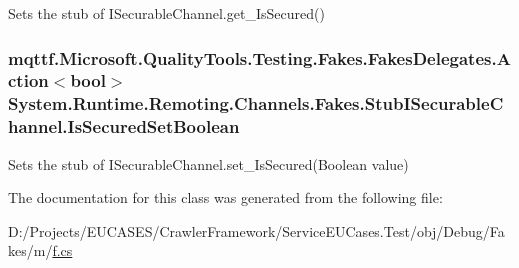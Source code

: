 Sets the stub of I\-Securable\-Channel.\-get\-\_\-\-Is\-Secured()

\hypertarget{class_system_1_1_runtime_1_1_remoting_1_1_channels_1_1_fakes_1_1_stub_i_securable_channel_a72bf924abde0e542f6be5ee725c185f9}{
\subsubsection[{Is\-Secured\-Set\-Boolean}]{\setlength{\rightskip}{0pt plus 5cm}mqttf.\-Microsoft.\-Quality\-Tools.\-Testing.\-Fakes.\-Fakes\-Delegates.\-Action$<$bool$>$ System.\-Runtime.\-Remoting.\-Channels.\-Fakes.\-Stub\-I\-Securable\-Channel.\-Is\-Secured\-Set\-Boolean}}\label{class_system_1_1_runtime_1_1_remoting_1_1_channels_1_1_fakes_1_1_stub_i_securable_channel_a72bf924abde0e542f6be5ee725c185f9}


Sets the stub of I\-Securable\-Channel.\-set\-\_\-\-Is\-Secured(\-Boolean value)



The documentation for this class was generated from the following file\-:\begin{DoxyCompactItemize}
\item 
D\-:/\-Projects/\-E\-U\-C\-A\-S\-E\-S/\-Crawler\-Framework/\-Service\-E\-U\-Cases.\-Test/obj/\-Debug/\-Fakes/m/\hyperlink{m_2f_8cs}{f.\-cs}\end{DoxyCompactItemize}
